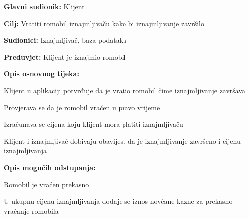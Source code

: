 						\noindent {}
						\begin{packed_item}
							
							\item \textbf{Glavni sudionik: }Klijent
							\item  \textbf{Cilj: }Vratiti romobil iznajmljivaču kako bi iznajmljivanje završilo
							\item  \textbf{Sudionici: }Iznajmljivač, baza podataka
							\item  \textbf{Preduvjet: }Klijent je iznajmio romobil
							\item  \textbf{Opis osnovnog tijeka:}
							
							\item[] \begin{packed_enum}
								
								\item Klijent u aplikaciji potvrđuje da je vratio romobil čime iznajmljivanje završava 
								\item Provjerava se da je romobil vraćen u pravo vrijeme 
								\item Izračunava se cijena koju klijent mora platiti iznajmljivaču 
								\item Klijent i iznajmljivač dobivaju obavijest da je iznajmljivanje završeno i cijenu iznajmljivanja  
							\end{packed_enum}
							
							\item  \textbf{Opis mogućih odstupanja:}
							
							\item[] \begin{packed_item}
								
								\item[2.a] Romobil je vraćen prekasno 
								\item[] \begin{packed_enum}
									
									\item U ukupnu cijenu iznajmljivanja dodaje se iznos novčane kazne za prekasno vraćanje romobila 
									
									
								\end{packed_enum}
								
							\end{packed_item}
						\end{packed_item}
						\noindent {}

